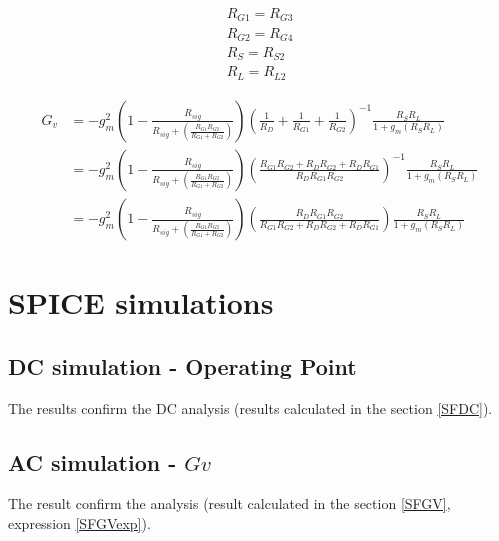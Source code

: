 \documentclass[10pt,a4paper]{book}
\begin{document}
\begin{align}
R_{G1} = R_{G3}\\
R_{G2} = R_{G4}\\
R_{S} = R_{S2}\\
R_{L} = R_{L2}
\end{align}

\begin{align}
G_v &= -g_m^2 \left(1 - \frac{ R_{sig}}{R_{sig} + \left(\frac{R_{G1}R_{G2}}{R_{G1}+R_{G2}}\right)}\right) \left(\frac{1}{R_D}+\frac{1}{R_{G1}}+\frac{1}{R_{G2}}\right)^{-1} \frac{R_{S} R_{L}}{1+g_m(R_{S} R_{L})}\\
&= -g_m^2 \left(1 - \frac{ R_{sig}}{R_{sig} + \left(\frac{R_{G1}R_{G2}}{R_{G1}+R_{G2}}\right)}\right) \left(\frac{R_{G1} R_{G2}+R_D R_{G2}+R_D R_{G1}}{R_D R_{G1} R_{G2}}\right)^{-1} \frac{R_{S} R_{L}}{1+g_m(R_{S} R_{L})}\\
&= -g_m^2 \left(1 - \frac{ R_{sig}}{R_{sig} + \left(\frac{R_{G1}R_{G2}}{R_{G1}+R_{G2}}\right)}\right) \left(\frac{R_D R_{G1} R_{G2}}{R_{G1} R_{G2}+R_D R_{G2}+R_D R_{G1}}\right) \frac{R_{S} R_{L}}{1+g_m(R_{S} R_{L})} \label{SFGVexp}
\end{align}

\clearpage
\section{SPICE simulations}
\subsection{DC simulation - Operating Point}

The results confirm the DC analysis (results calculated in the section \ref{SFDC}).


\subsection{AC simulation - $Gv$}

The result confirm the analysis (result calculated in the section \ref{SFGV}, expression \ref{SFGVexp}).

\end{document}
